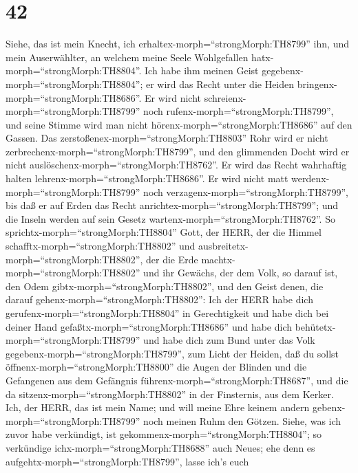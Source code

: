 \hypertarget{section-41}{%
\section{42}\label{section-41}}

 Siehe, das ist mein Knecht, ich
erhaltex-morph=``strongMorph:TH8799'' ihn, und mein Auserwählter, an
welchem meine Seele Wohlgefallen hatx-morph=``strongMorph:TH8804''. Ich
habe ihm meinen Geist gegebenx-morph=``strongMorph:TH8804''; er wird das
Recht unter die Heiden bringenx-morph=``strongMorph:TH8686''.
 Er wird nicht schreienx-morph=``strongMorph:TH8799'' noch
rufenx-morph=``strongMorph:TH8799'', und seine Stimme wird man nicht
hörenx-morph=``strongMorph:TH8686'' auf den Gassen.  Das
zerstoßenex-morph=``strongMorph:TH8803'' Rohr wird er nicht
zerbrechenx-morph=``strongMorph:TH8799'', und den glimmenden Docht wird
er nicht auslöschenx-morph=``strongMorph:TH8762''. Er wird das Recht
wahrhaftig halten lehrenx-morph=``strongMorph:TH8686''.  Er
wird nicht matt werdenx-morph=``strongMorph:TH8799'' noch
verzagenx-morph=``strongMorph:TH8799'', bis daß er auf Erden das Recht
anrichtex-morph=``strongMorph:TH8799''; und die Inseln werden auf sein
Gesetz wartenx-morph=``strongMorph:TH8762''.  So
sprichtx-morph=``strongMorph:TH8804'' Gott, der HERR, der die Himmel
schafftx-morph=``strongMorph:TH8802'' und
ausbreitetx-morph=``strongMorph:TH8802'', der die Erde
machtx-morph=``strongMorph:TH8802'' und ihr Gewächs, der dem Volk, so
darauf ist, den Odem gibtx-morph=``strongMorph:TH8802'', und den Geist
denen, die darauf gehenx-morph=``strongMorph:TH8802'':  Ich
der HERR habe dich gerufenx-morph=``strongMorph:TH8804'' in
Gerechtigkeit und habe dich bei deiner Hand
gefaßtx-morph=``strongMorph:TH8686'' und habe dich
behütetx-morph=``strongMorph:TH8799'' und habe dich zum Bund unter das
Volk gegebenx-morph=``strongMorph:TH8799'', zum Licht der Heiden,
 daß du sollst öffnenx-morph=``strongMorph:TH8800'' die
Augen der Blinden und die Gefangenen aus dem Gefängnis
führenx-morph=``strongMorph:TH8687'', und die da
sitzenx-morph=``strongMorph:TH8802'' in der Finsternis, aus dem Kerker.
 Ich, der HERR, das ist mein Name; und will meine Ehre
keinem andern gebenx-morph=``strongMorph:TH8799'' noch meinen Ruhm den
Götzen.  Siehe, was ich zuvor habe verkündigt, ist
gekommenx-morph=``strongMorph:TH8804''; so verkündige
ichx-morph=``strongMorph:TH8688'' auch Neues; ehe denn es
aufgehtx-morph=``strongMorph:TH8799'', lasse ich's euch
